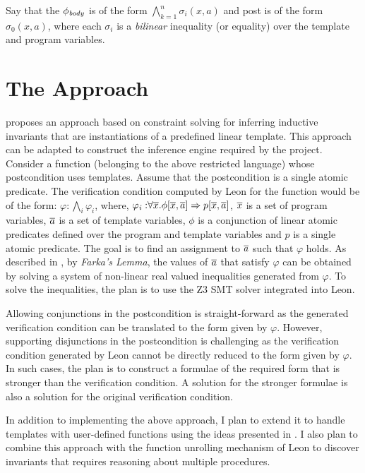 \documentclass[a4paper,10pt]{article}
\begin{document}
Say that the $\mathit{\phi_{body}}$ is of the form $\bigwedge \limits_{k=1}^{n} \sigma_i(x,a)$ and  
post is of the form $\sigma_0(x,a)$, where each $\sigma_i$ is a \emph{bilinear} inequality (or equality) over the template and program variables. 





\section{The Approach}

\cite{ssriram:CAV03,ssriram:SAS04} proposes an approach based on constraint solving for inferring  inductive invariants that are instantiations of a predefined linear template. This approach can be adapted to construct the inference engine required by the project. Consider a function (belonging to the above restricted language) whose postcondition uses templates. Assume that the postcondition is a single atomic predicate. The verification condition computed by Leon for the function would be of the form: $\varphi: \bigwedge_i \varphi_i$, where,
$\mathit{\varphi_i: } \forall \overline{x}. \phi[\overline{x},\overline{a}] \Rightarrow p[\overline{x},\overline{a}]$, $\overline{x}$ is a set of program variables, $\overline{a}$ is a set of template variables, $\phi$ is a conjunction of linear atomic predicates defined over the program and template variables and $p$ is a single atomic predicate.
The goal is to find an assignment to $\overline{a}$ such that $\varphi$ holds.
As described in \cite{ssriram:CAV03}, by \textit{Farka's Lemma}, the values of $\overline{a}$ that satisfy $\varphi$ can be obtained by solving a system of non-linear real valued inequalities generated from $\varphi$. To solve the inequalities, the plan is to use the Z3 SMT solver integrated into Leon.

Allowing conjunctions in the postcondition is straight-forward as the generated  verification condition can be translated to the  form given by $\varphi$. However, supporting disjunctions in the postcondition is challenging as the verification condition generated by Leon cannot be directly reduced to the form given by $\varphi$. In such cases, the plan is to construct a formulae of the required form that is stronger than the verification condition. A solution for the stronger formulae is also a solution 
for the original verification condition.

In addition to implementing the above approach, I plan to extend it to handle templates with user-defined functions using the ideas presented in \cite{dirk:VMCAI07}. I also plan to combine this approach with the function unrolling mechanism of Leon to discover invariants that requires reasoning about multiple procedures.
 
\end{document}
